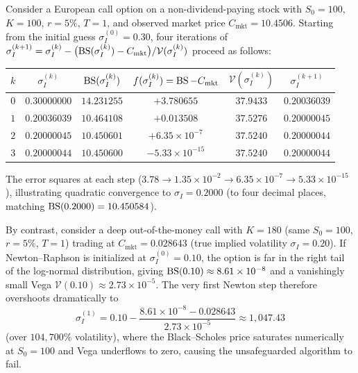 \begin{example}
    \label{ex:ch05-newton-raphson}
    Consider a European call option on a non-dividend-paying stock with $S_0 = 100$, $K = 100$, $r = 5\%$, $T = 1$, and observed market price $C_{\mathrm{mkt}} = 10.4506$. Starting from the initial guess $\sigma_I^{(0)} = 0.30$, four iterations of $\sigma_I^{(k+1)} = \sigma_I^{(k)} - \bigl(\operatorname{BS}(\sigma_I^{(k)}) - C_{\mathrm{mkt}}\bigr)/\mathcal{V}(\sigma_I^{(k)})$ proceed as follows:
    \begin{center}
        \begin{tabular}{cccccc}
            \toprule
            $k$ & $\sigma_I^{(k)}$ & $\operatorname{BS}(\sigma_I^{(k)})$ & $f(\sigma_I^{(k)}) = \operatorname{BS} - C_{\mathrm{mkt}}$ & $\mathcal{V}(\sigma_I^{(k)})$ & $\sigma_I^{(k+1)}$ \\
            \midrule
            $0$ & $0.30000000$ & $14.231255$ & $+3.780655$ & $37.9433$ & $0.20036039$ \\
            $1$ & $0.20036039$ & $10.464108$ & $+0.013508$ & $37.5276$ & $0.20000045$ \\
            $2$ & $0.20000045$ & $10.450601$ & $+6.35 \times 10^{-7}$ & $37.5240$ & $0.20000044$ \\
            $3$ & $0.20000044$ & $10.450600$ & $-5.33 \times 10^{-15}$ & $37.5240$ & $0.20000044$ \\
            \bottomrule
        \end{tabular}
    \end{center}
    The error squares at each step ($3.78 \to 1.35 \times 10^{-2} \to 6.35 \times 10^{-7} \to 5.33 \times 10^{-15}$), illustrating quadratic convergence to $\sigma_I = 0.2000$ (to four decimal places, matching $\operatorname{BS}(0.2000) = 10.450584$).

    By contrast, consider a deep out-of-the-money call with $K = 180$ (same $S_0 = 100$, $r = 5\%$, $T = 1$) trading at $C_{\mathrm{mkt}} = 0.028643$ (true implied volatility $\sigma_I = 0.20$). If Newton--Raphson is initialized at $\sigma_I^{(0)} = 0.10$, the option is far in the right tail of the log-normal distribution, giving $\operatorname{BS}(0.10) \approx 8.61 \times 10^{-8}$ and a vanishingly small Vega $\mathcal{V}(0.10) \approx 2.73 \times 10^{-5}$. The very first Newton step therefore overshoots dramatically to
    \[
        \sigma_I^{(1)} = 0.10 - \frac{8.61 \times 10^{-8} - 0.028643}{2.73 \times 10^{-5}} \approx 1{,}047.43
    \]
    (over $104{,}700\%$ volatility), where the Black--Scholes price saturates numerically at $S_0 = 100$ and Vega underflows to zero, causing the unsafeguarded algorithm to fail.
\end{example}

